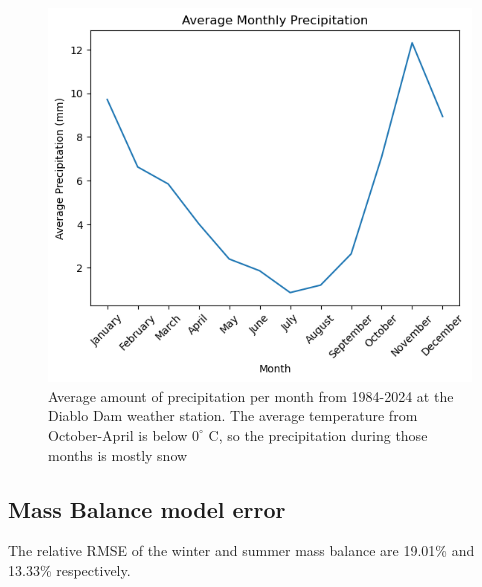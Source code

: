 \documentclass{article}
\begin{document}
\begin{figure}[h]
    \centering
    \includegraphics[width=\textwidth]{Plots/monthly_precip.png}
    \caption{Average amount of precipitation per month from 1984-2024 at the Diablo Dam weather station. The average temperature from October-April is below $0^\circ$ C, so the precipitation during those months is mostly snow}
    \label{fig:monthly_precip}
\end{figure}    
\FloatBarrier

\subsection{Mass Balance model error}
The relative RMSE of the winter and summer mass balance are 19.01\% and 13.33\% respectively.
\end{document}
